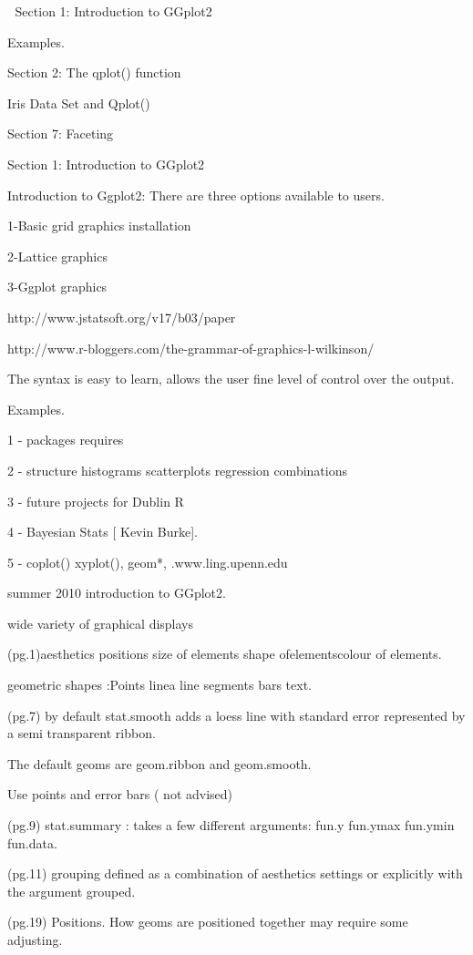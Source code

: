 

Section 1: Introduction to GGplot2

Examples.

Section 2: The qplot() function

Iris Data Set and Qplot()

Section 7: Faceting


Section 1: Introduction to GGplot2


Introduction to Ggplot2: There are three options available to users.


1-Basic grid graphics installation

2-Lattice graphics

3-Ggplot graphics






http://www.jstatsoft.org/v17/b03/paper

http://www.r-bloggers.com/the-grammar-of-graphics-l-wilkinson/


The syntax is easy to learn, allows the user fine level of control over the output.

Examples.


1 - packages requires

2 - structure histograms scatterplots regression combinations

3 - future projects for Dublin R

4 - Bayesian Stats [ Kevin Burke].

5 - coplot() xyplot(), geom*, .www.ling.upenn.edu 

summer 2010 introduction to GGplot2.


wide variety of graphical displays 


(pg.1)aesthetics positions size of elements shape ofelementscolour of elements.

geometric shapes :Points linea line segments bars text.


(pg.7) by default stat.smooth adds a loess line with standard error represented by a semi transparent ribbon.

The default geoms are geom.ribbon and geom.smooth.


Use points and error bars ( not advised)

(pg.9) stat.summary : takes a few different arguments: fun.y fun.ymax fun.ymin fun.data.


(pg.11) grouping defined as a combination of aesthetics settings or explicitly with the argument grouped.

(pg.19) Positions. How geoms are positioned together may require some adjusting.

